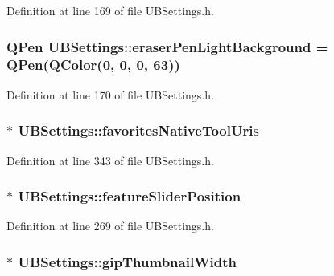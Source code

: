 Definition at line 169 of file U\-B\-Settings.\-h.

\hypertarget{class_u_b_settings_ad3b39d5b3ade1daf61d1dc434be2b61b}{
\subsubsection[{eraser\-Pen\-Light\-Background}]{\setlength{\rightskip}{0pt plus 5cm}Q\-Pen U\-B\-Settings\-::eraser\-Pen\-Light\-Background = Q\-Pen(Q\-Color(0, 0, 0, 63))\hspace{0.3cm}{\ttfamily [static]}}}\label{db/d66/class_u_b_settings_ad3b39d5b3ade1daf61d1dc434be2b61b}


Definition at line 170 of file U\-B\-Settings.\-h.

\hypertarget{class_u_b_settings_aee964b872d72f35bd573653ead9256db}{
\subsubsection[{favorites\-Native\-Tool\-Uris}]{$\ast$ U\-B\-Settings\-::favorites\-Native\-Tool\-Uris}}\label{db/d66/class_u_b_settings_aee964b872d72f35bd573653ead9256db}


Definition at line 343 of file U\-B\-Settings.\-h.

\hypertarget{class_u_b_settings_a85902693456aab2bf8f565f4198aeaa6}{
\subsubsection[{feature\-Slider\-Position}]{$\ast$ U\-B\-Settings\-::feature\-Slider\-Position}}\label{db/d66/class_u_b_settings_a85902693456aab2bf8f565f4198aeaa6}


Definition at line 269 of file U\-B\-Settings.\-h.

\hypertarget{class_u_b_settings_abd7c3af35f64a130229bdd2d0ac6966c}{
\subsubsection[{gip\-Thumbnail\-Width}]{$\ast$ U\-B\-Settings\-::gip\-Thumbnail\-Width}}\label{db/d66/class_u_b_settings_abd7c3af35f64a130229bdd2d0ac6966c}


